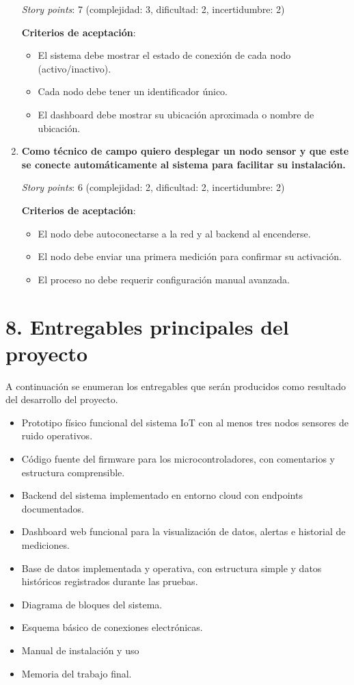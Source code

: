 \documentclass[
11pt, %
]{charter}
\begin{document}
\begin{enumerate}
    \textit{Story points}: 7 (complejidad: 3, dificultad: 2, incertidumbre: 2)

    \textbf{Criterios de aceptación}:
    \begin{itemize}
        \item El sistema debe mostrar el estado de conexión de cada nodo (activo/inactivo).
        \item Cada nodo debe tener un identificador único.
        \item El dashboard debe mostrar su ubicación aproximada o nombre de ubicación.
    \end{itemize}

    \item \textbf{Como técnico de campo quiero desplegar un nodo sensor y que este se conecte automáticamente al sistema para facilitar su instalación.}

    \textit{Story points}: 6 (complejidad: 2, dificultad: 2, incertidumbre: 2)

    \textbf{Criterios de aceptación}:
    \begin{itemize}
        \item El nodo debe autoconectarse a la red y al backend al encenderse.
        \item El nodo debe enviar una primera medición para confirmar su activación.
        \item El proceso no debe requerir configuración manual avanzada.
    \end{itemize}
\end{enumerate}

\section{8. Entregables principales del proyecto}
\label{sec:entregables}

A continuación se enumeran los entregables que serán producidos como resultado del desarrollo del proyecto. 

\begin{itemize}
    \item Prototipo físico funcional del sistema IoT con al menos tres nodos sensores de ruido operativos.
    \item Código fuente del firmware para los microcontroladores, con comentarios y estructura comprensible.
    \item Backend del sistema implementado en entorno cloud con endpoints documentados.
    \item Dashboard web funcional para la visualización de datos, alertas e historial de mediciones.
    \item Base de datos implementada y operativa, con estructura simple y datos históricos registrados durante las pruebas.
    \item Diagrama de bloques del sistema.
    \item Esquema básico de conexiones electrónicas.
    \item Manual de instalación y uso
    \item Memoria del trabajo final.
    
\end{itemize}
\end{document}
